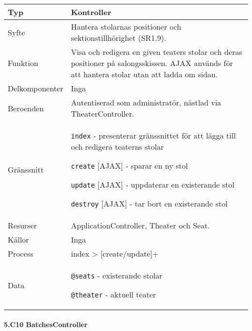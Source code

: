 \documentclass[a4paper, twoside, 11pt, titlepage]{article}
\begin{document}
			\begin {table} [ht] \begin{tabular} {  p{3.5cm} p{9.6cm} }
				\hline
				{Typ} & {Kontroller} \\
				\hline
				{Syfte} & {Hantera stolarnas positioner och sektionstillhörighet (SR1.9).} \\
				\hline
				{Funktion} & {Visa och redigera en given teaters stolar och deras positioner på salongsskissen. AJAX används för att hantera stolar utan att ladda om sidan.} \\
				\hline
				{Delkomponenter} & {Inga} \\
				\hline
				{Beroenden} & {Autentiserad som administratör, nästlad via TheaterController.} \\
				\hline
				{Gränssnitt} & {{\tt index} - presenterar gränssnittet för att lägga till och redigera teaterns stolar

{\tt create} [AJAX] - sparar en ny stol

{\tt update} [AJAX] - uppdaterar en existerande stol

{\tt destroy} [AJAX] - tar bort en existerande stol} \\
				\hline
				{Resurser} & {ApplicationController, Theater och Seat.} \\
				\hline
				{Källor} & {Inga} \\
				\hline
				{Process} & {index > [create/update]+} \\
				\hline
				{Data} & {{\tt @seats} - existerande stolar

{\tt @theater} - aktuell teater} \\
				\hline
			\end{tabular} \end{table} \FloatBarrier


			\paragraph{5.C10 BatchesController}\
\end{document}
